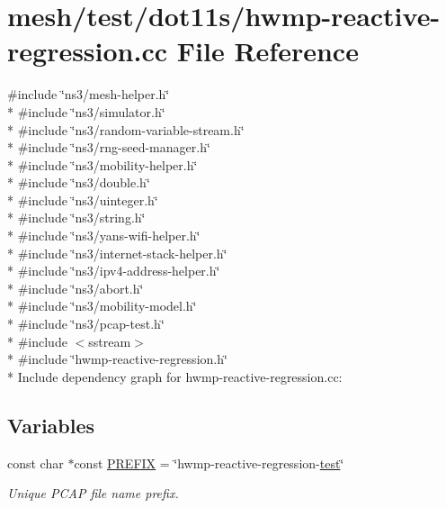 \hypertarget{hwmp-reactive-regression_8cc}{}\section{mesh/test/dot11s/hwmp-\/reactive-\/regression.cc File Reference}
\label{hwmp-reactive-regression_8cc}
{\ttfamily \#include \char`\"{}ns3/mesh-\/helper.\+h\char`\"{}}\\*
{\ttfamily \#include \char`\"{}ns3/simulator.\+h\char`\"{}}\\*
{\ttfamily \#include \char`\"{}ns3/random-\/variable-\/stream.\+h\char`\"{}}\\*
{\ttfamily \#include \char`\"{}ns3/rng-\/seed-\/manager.\+h\char`\"{}}\\*
{\ttfamily \#include \char`\"{}ns3/mobility-\/helper.\+h\char`\"{}}\\*
{\ttfamily \#include \char`\"{}ns3/double.\+h\char`\"{}}\\*
{\ttfamily \#include \char`\"{}ns3/uinteger.\+h\char`\"{}}\\*
{\ttfamily \#include \char`\"{}ns3/string.\+h\char`\"{}}\\*
{\ttfamily \#include \char`\"{}ns3/yans-\/wifi-\/helper.\+h\char`\"{}}\\*
{\ttfamily \#include \char`\"{}ns3/internet-\/stack-\/helper.\+h\char`\"{}}\\*
{\ttfamily \#include \char`\"{}ns3/ipv4-\/address-\/helper.\+h\char`\"{}}\\*
{\ttfamily \#include \char`\"{}ns3/abort.\+h\char`\"{}}\\*
{\ttfamily \#include \char`\"{}ns3/mobility-\/model.\+h\char`\"{}}\\*
{\ttfamily \#include \char`\"{}ns3/pcap-\/test.\+h\char`\"{}}\\*
{\ttfamily \#include $<$sstream$>$}\\*
{\ttfamily \#include \char`\"{}hwmp-\/reactive-\/regression.\+h\char`\"{}}\\*
Include dependency graph for hwmp-\/reactive-\/regression.cc\+:
\subsection*{Variables}
\begin{DoxyCompactItemize}
\item 
const char $\ast$const \hyperlink{hwmp-reactive-regression_8cc_a61dc66981fa47bfd0066a57a487c599c}{P\+R\+E\+F\+IX} = \char`\"{}hwmp-\/reactive-\/regression-\/\hyperlink{main-test-sync_8cc_a708a4c1a4d0c4acc4c447310dd4db27f}{test}\char`\"{}
\begin{DoxyCompactList}\small\item\em Unique P\+C\+AP file name prefix. \end{DoxyCompactList}\end{DoxyCompactItemize}


